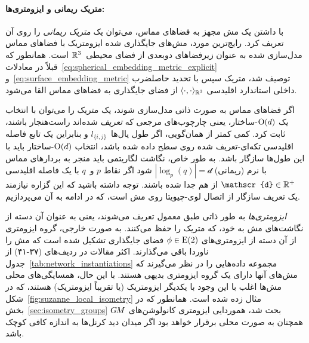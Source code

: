 \paragraph{متریک ریمانی و ایزومتری‌ها:}
با داشتن یک مش مجهز به فضاهای مماس، می‌توان یک \emph{متریک ریمانی} را روی آن تعریف کرد.
رایج‌ترین مورد، مش‌های جایگذاری شده ایزومتریک با فضاهای مماس مدل‌سازی شده به عنوان زیرفضاهای دوبعدی از فضای محیطی~$\mathbb{R}^3$ است.
همانطور که قبلاً در معادلات~\eqref{eq:spherical_embedding_metric_explicit} و~\eqref{eq:surface_embedding_metric} توصیف شد، متریک سپس با تحدید حاصلضرب داخلی استاندارد اقلیدسی $\langle\cdot,\cdot\rangle_{\mathbb{R}^3}$ از فضای جایگذاری به فضاهای مماس القا می‌شود.

اگر فضاهای مماس به صورت ذاتی مدل‌سازی شوند، یک متریک را می‌توان با انتخاب یک $\operatorname{O}(d)$-ساختار، یعنی چارچوب‌های مرجعی که \emph{تعریف} شده‌اند راست‌هنجار باشند، ثابت کرد.
کمی کمتر از همان‌گویی، اگر طول یال‌ها~$l_{\{i,j\}}$ و بنابراین یک تابع فاصله اقلیدسی تکه‌ای-تعریف شده روی سطح داده شده باشد، انتخاب $\operatorname{O}(d)$-ساختار باید با این طول‌ها سازگار باشد.
به طور خاص، نگاشت لگاریتمی باید منجر به بردارهای مماس با نرم (ریمانی) $|\log_p(q)| = \mathscr{d}$ شود اگر نقاط $p$ و~$q$ با یک فاصله اقلیدسی $\mathscr{d} \in \R^+$ از هم جدا شده باشند.
توجه داشته باشید که این گزاره نیازمند یک تعریف سازگار از اتصال لوی-چیویتا روی مش است، که در ادامه به آن می‌پردازیم.


\emph{ایزومتری‌ها} به طور ذاتی طبق معمول تعریف می‌شوند، یعنی به عنوان آن دسته از نگاشت‌های مش به خود، که متریک را حفظ می‌کنند.
به صورت خارجی، گروه ایزومتری از آن دسته از ایزومتری‌های $\phi \in \operatorname{E}(2)$ فضای جایگذاری تشکیل شده است که مش را ناوردا باقی می‌گذارند.
اکثر مقالات در
ردیف‌های (۳۷-۴۱)
از جدول~\ref{tab:network_instantiations}
مجموعه داده‌هایی را در نظر می‌گیرند که مش‌های آنها دارای یک گروه ایزومتری بدیهی هستند.
با این حال، همسایگی‌های محلی مش‌ها اغلب با این وجود با یکدیگر ایزومتریک (یا تقریباً ایزومتریک) هستند، که در شکل~\ref{fig:suzanne_local_isometry} مثال زده شده است.
همانطور که در بخش~\ref{sec:isometry_groups} بحث شد، هموردایی ایزومتری کانولوشن‌های $G\mkern-1.4muM$ همچنان به صورت محلی برقرار خواهد بود اگر میدان دید کرنل‌ها به اندازه کافی کوچک باشد.







